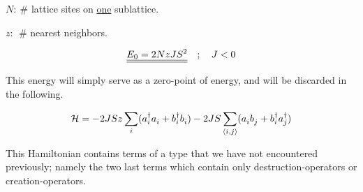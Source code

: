 \begin{description}
    \item $N: \ \#$ lattice sites on \uline{one} sublattice.
    \item $z:\ \ \#$ nearest neighbors.
\end{description}

\begin{equation}
    \uline{\uline{E_0 = 2NzJS^2}} \quad ; \quad J < 0
\end{equation}

This energy will simply serve as a zero-point of energy, and will be discarded in the following.

\begin{tcolorbox}
    \begin{equation}
        \mathcal{H} = -2JSz\sum_i (a_i^\dagger a_i^{} + b_i^\dagger b_i^{}) - 2JS \sum_{\langle i, j \rangle} (a_i^{} b_j^{} + b_i^\dagger a_j^\dagger)
    \end{equation}
\end{tcolorbox}

This Hamiltonian contains terms of a type that we have not encountered previously; namely the two last terms which contain only destruction-operators or creation-operators.
